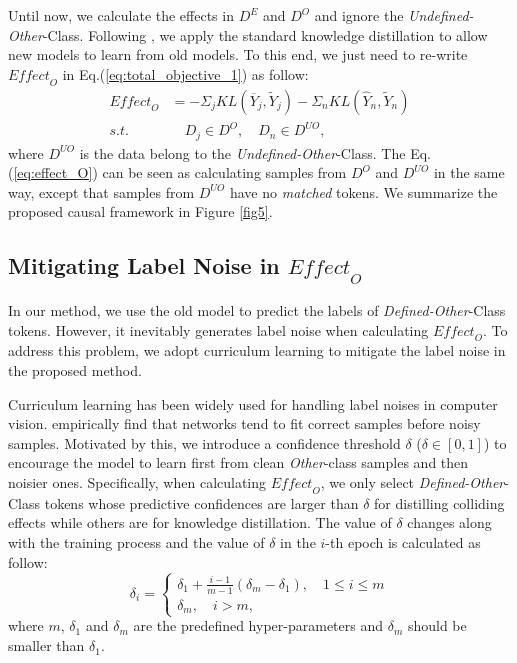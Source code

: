 \documentclass[11pt]{article}
\begin{document}
Until now, we calculate the effects in $D^E$ and $D^O$ and ignore the \textit{Undefined-Other}-Class.
Following \citet{monaikul2021continual}, we apply the standard knowledge distillation to allow new models to learn from old models.
To this end, we just need to re-write $\textit{Effect}_O$ in Eq.(\ref{eq:total_objective_1}) as follow:
\begin{align}
    \textit{Effect}_O &=  - \Sigma_j \textit{KL}(\overline{Y}_j,\widetilde{Y}_j) - \Sigma_n \textit{KL}(\hat{Y}_n,\widetilde{Y}_n) \label{eq:effect_O} \\
    \nonumber \textit{s.t.}& \quad D_j \in D^O, \quad D_n \in D^{UO},
\end{align}
where $D^{UO}$ is the data belong to the \textit{Undefined-Other}-Class.
The Eq.(\ref{eq:effect_O}) can be seen as calculating samples from $D^O$ and $D^{UO}$ in the same way, except that samples from $D^{UO}$ have no \textit{matched} tokens. 
We summarize the proposed causal framework in Figure \ref{fig5}.

\subsection{Mitigating Label Noise in $\textit{Effect}_O$\label{subsec:4.3}}
In our method, we use the old model to predict the labels of \textit{Defined-Other}-Class tokens.
However, it inevitably generates label noise when calculating $\textit{Effect}_O$.
To address this problem, we adopt curriculum learning to mitigate the label noise in the proposed method.

Curriculum learning has been widely used for handling label noises \citep{guo2018curriculumnet} in computer vision.
\citet{arazo2019unsupervised} empirically find that networks tend to fit correct samples before noisy samples.
Motivated by this,  we introduce a confidence threshold $\delta$ ($\delta \in [0,1]$) to encourage the model to learn first from clean \textit{Other}-class samples and then noisier ones.
Specifically, when calculating $\textit{Effect}_O$, we only select \textit{Defined-Other}-Class tokens whose predictive confidences are larger than $\delta$ for distilling colliding effects while others are for knowledge distillation.
The value of $\delta$ changes along with the training process and the value of $\delta$ in the $i$-th epoch is calculated as follow:
\begin{equation}
    \delta_i = 
    \begin{cases}
    \delta_1 + \frac{i-1}{m-1}(\delta_m-\delta_1), \quad 1 \le i \le m \\
    \delta_m ,\quad i > m, 
    \end{cases}
\end{equation}
where $m$, $\delta_1$ and $\delta_m$ are the predefined hyper-parameters and $\delta_m$ should be smaller than $\delta_1$.
\end{document}
